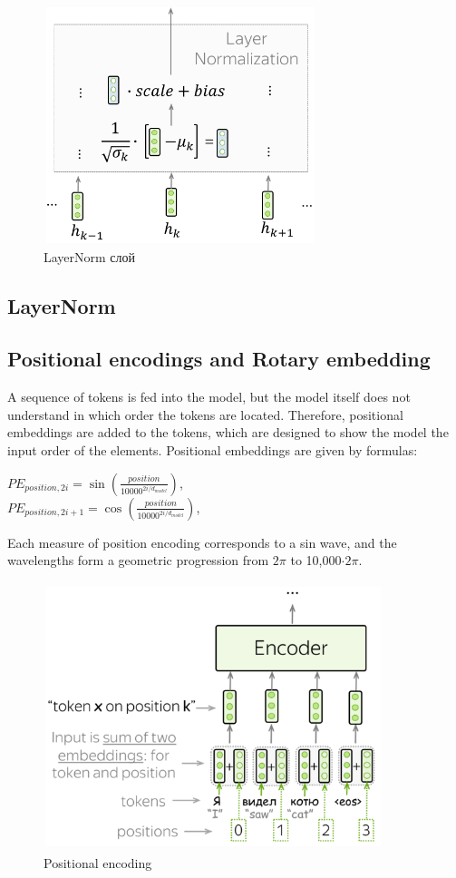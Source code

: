 \documentclass[PMI,VKR]{HSEUniversity}
\begin{document}
\begin{figure}[h]
    \centering
    \includegraphics[scale=1]{img/layer_norm.png}
    \caption{LayerNorm слой}
\end{figure}

\subsection{LayerNorm}


\subsection{Positional encodings and Rotary embedding}

A sequence of tokens is fed into the model, but the model itself does not understand in which order the tokens are located. 
Therefore, positional embeddings are added to the tokens, which are designed to show the model the input order of the elements.
Positional embeddings are given by formulas:
\begin{center}
    $PE_{position, 2i} = \sin(\frac{position}{10000^{2i/d_{model}}})$, \\
    $PE_{position, 2i+1} = \cos(\frac{position}{10000^{2i/d_{model}}})$, \\
\end{center}

Each measure of position encoding corresponds to a sin wave, and the wavelengths form a geometric progression from $2\pi$ to 10,000$\cdot 2\pi$.

\begin{figure}[h]
    \centering
    \includegraphics[scale=1]{img/pos_encoding.png}
    \caption{Positional encoding}
\end{figure}
\end{document}
